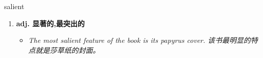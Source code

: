 
\begin{frame}
{\huge salient}
\begin{center}
\begin{enumerate}\Large
  \item \textbf{adj. 显著的,最突出的}
  \begin{itemize}
    \item \em{\Large{The most salient feature of the book is its papyrus cover. 该书最明显的特点就是莎草纸的封面。}}
  \end{itemize}
\end{enumerate}
\end{center}
\end{frame}
